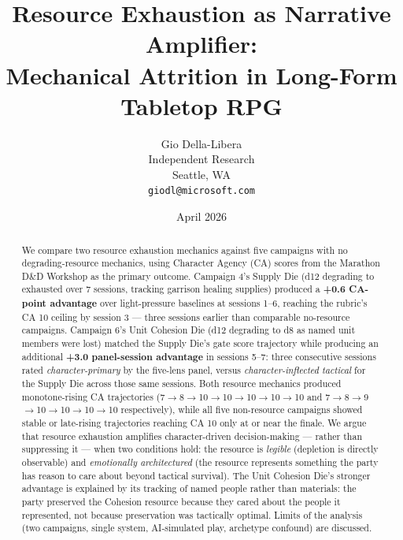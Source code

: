 \documentclass{article}
\begin{document}
\title{Resource Exhaustion as Narrative Amplifier:\\
       Mechanical Attrition in Long-Form Tabletop RPG}

\author{
  Gio Della-Libera \\
  Independent Research \\
  Seattle, WA \\
  \texttt{giodl@microsoft.com}
}

\date{April 2026}

\maketitle

\begin{abstract}
We compare two resource exhaustion mechanics against five campaigns with no degrading-resource
mechanics, using Character Agency (CA) scores from the Marathon D\&D Workshop as the primary
outcome. Campaign 4's Supply Die (d12 degrading to exhausted over 7 sessions, tracking garrison
healing supplies) produced a \textbf{+0.6 CA-point advantage} over light-pressure baselines at
sessions 1--6, reaching the rubric's CA 10 ceiling by session 3 --- three sessions earlier than
comparable no-resource campaigns. Campaign 6's Unit Cohesion Die (d12 degrading to d8 as named
unit members were lost) matched the Supply Die's gate score trajectory while producing an
additional \textbf{+3.0 panel-session advantage} in sessions 5--7: three consecutive sessions
rated \textit{character-primary} by the five-lens panel, versus \textit{character-inflected
tactical} for the Supply Die across those same sessions. Both resource mechanics produced
monotone-rising CA trajectories (7$\to$8$\to$10$\to$10$\to$10$\to$10$\to$10 and
7$\to$8$\to$9$\to$10$\to$10$\to$10$\to$10 respectively), while all five non-resource
campaigns showed stable or late-rising trajectories reaching CA 10 only at or near the finale.
We argue that resource exhaustion amplifies character-driven decision-making --- rather than
suppressing it --- when two conditions hold: the resource is \textit{legible} (depletion is
directly observable) and \textit{emotionally architectured} (the resource represents something
the party has reason to care about beyond tactical survival). The Unit Cohesion Die's stronger
advantage is explained by its tracking of named people rather than materials: the party
preserved the Cohesion resource because they cared about the people it represented, not
because preservation was tactically optimal. Limits of the analysis (two campaigns, single
system, AI-simulated play, archetype confound) are discussed.
\end{abstract}










\end{document}
